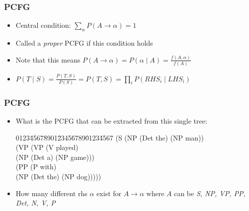 \begin{frame}
\frametitle{PCFG}
\begin{itemize}
\item Central condition: \( \sum_\alpha P( A \rightarrow \alpha) = 1 \)
\item Called a {\em proper} PCFG if this condition holds
\item Note that this means $P( A \rightarrow \alpha) = P( \alpha \mid A) = \frac{f(A, \alpha)}{f(A)}$
\item \( P(T \mid S) = \frac{P(T,S)}{P(S)} = P(T,S) = \prod_i P(RHS_i \mid LHS_i) \)
\end{itemize}

\end{frame}



\begin{frame}
\frametitle{PCFG}
\begin{itemize}
\item What is the PCFG that can be extracted from this single tree: 
\begin{tabbing}
0123\=4567\=8901\=2345\=6789\=0123\=4567 \kill
(S \>(NP (Det the) (NP man)) \\
\> (VP \> (VP \> (V played) \\
\> \> \> (NP (Det a) (NP game))) \\
\> \> (PP \>(P with) \\
\> \> \> (NP (Det the) (NP dog)))))
\end{tabbing}
\item How many different rhs $\alpha$ exist for $A \rightarrow \alpha$ where $A$ can be {\it S, NP, VP, PP, Det, N, V, P}
\end{itemize}

\end{frame}

